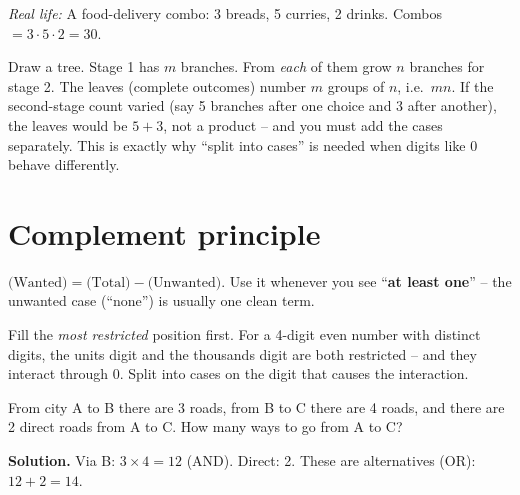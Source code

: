 \documentclass[11pt,a4paper,openany]{report}
\begin{document}
\textit{Real life:} A food-delivery combo: 3 breads, 5 curries, 2 drinks. Combos $=3\cdot5\cdot2=30$.
\begin{center}
\end{center}

\begin{why}
Draw a tree. Stage 1 has $m$ branches. From \emph{each} of them grow $n$ branches for stage 2.
The leaves (complete outcomes) number $m$ groups of $n$, i.e.\ $mn$. If the second-stage count
varied (say 5 branches after one choice and 3 after another), the leaves would be $5+3$, not a
product -- and you must add the cases separately. This is exactly why ``split into cases'' is
needed when digits like 0 behave differently.
\end{why}

\section{Complement principle}
$\text{(Wanted)} = \text{(Total)} - \text{(Unwanted)}$.
Use it whenever you see ``\textbf{at least one}'' -- the unwanted case (``none'') is usually one clean term.

\begin{shortcut}
Fill the \emph{most restricted} position first. For a 4-digit even number with distinct
digits, the units digit and the thousands digit are both restricted -- and they interact
through 0. Split into cases on the digit that causes the interaction.
\end{shortcut}

\begin{example}
From city A to B there are 3 roads, from B to C there are 4 roads, and there are 2 direct
roads from A to C. How many ways to go from A to C?

\textbf{Solution.} Via B: $3\times4=12$ (AND). Direct: 2. These are alternatives (OR): $12+2=14$.
\end{example}
\end{document}
